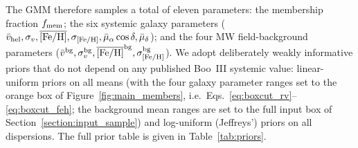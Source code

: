 \documentclass[twocolumn]{aastex631}
\begin{document}
The GMM therefore samples a total of eleven parameters: the membership fraction $f_{\rm mem}$; the six systemic galaxy parameters ($\bar v_{\rm hel}, \sigma_v, \overline{[\mathrm{Fe/H}]}, \sigma_{[\mathrm{Fe/H}]}, \bar\mu_\alpha\cos\delta, \bar\mu_\delta$); and the four MW field-background parameters ($\bar v^{\rm bg}, \sigma_v^{\rm bg}, \overline{[\mathrm{Fe/H}]}^{\rm bg}, \sigma_{[\mathrm{Fe/H}]}^{\rm bg}$). We adopt deliberately weakly informative priors that do not depend on any published Boo~III systemic value: linear-uniform priors on all means (with the four galaxy parameter ranges set to the orange box of Figure~\ref{fig:main_members}, i.e.\ Eqs.~\ref{eq:boxcut_rv}--\ref{eq:boxcut_feh}; the background mean ranges are set to the full input box of Section~\ref{section:input_sample}) and log-uniform (Jeffreys') priors on all dispersions. The full prior table is given in Table~\ref{tab:priors}.




\end{document}
